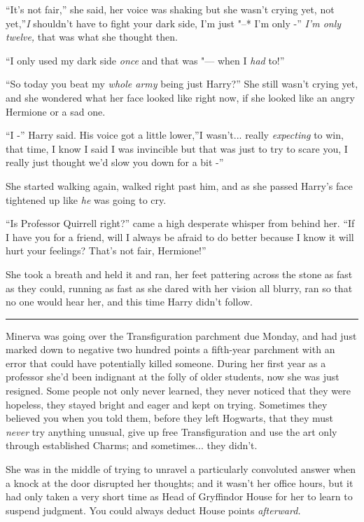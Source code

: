 ``It's not fair,'' she said, her voice was shaking but she wasn't crying
yet, not yet,''\emph{I} shouldn't have to fight your dark side, I'm just
"--* I'm only -'' \emph{I'm only twelve,} that was what she thought then.

``I only used my dark side \emph{once} and that was "--- when I \emph{had}
to!''

``So today you beat my \emph{whole army} being just Harry?'' She still
wasn't crying yet, and she wondered what her face looked like right now,
if she looked like an angry Hermione or a sad one.

``I -'' Harry said. His voice got a little lower,''I wasn't...
really \emph{expecting} to win, that time, I know I said I was
invincible but that was just to try to scare you, I really just thought
we'd slow you down for a bit -''

She started walking again, walked right past him, and as she passed
Harry's face tightened up like \emph{he} was going to cry.

``Is Professor Quirrell right?'' came a high desperate whisper from
behind her. ``If I have you for a friend, will I always be afraid to do
better because I know it will hurt your feelings? That's not fair,
Hermione!''

She took a breath and held it and ran, her feet pattering across the
stone as fast as they could, running as fast as she dared with her
vision all blurry, ran so that no one would hear her, and this time
Harry didn't follow.

\begin{center}\rule{3in}{0.4pt}\end{center}

Minerva was going over the Transfiguration parchment due Monday, and had
just marked down to negative two hundred points a fifth-year parchment
with an error that could have potentially killed someone. During her
first year as a professor she'd been indignant at the folly of older
students, now she was just resigned. Some people not only never learned,
they never noticed that they were hopeless, they stayed bright and eager
and kept on trying. Sometimes they believed you when you told them,
before they left Hogwarts, that they must \emph{never} try anything
unusual, give up free Transfiguration and use the art only through
established Charms; and sometimes... they didn't.

She was in the middle of trying to unravel a particularly convoluted
answer when a knock at the door disrupted her thoughts; and it wasn't
her office hours, but it had only taken a very short time as Head of
Gryffindor House for her to learn to suspend judgment. You could always
deduct House points \emph{afterward.}

